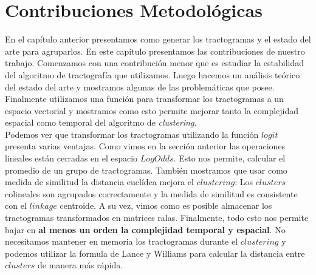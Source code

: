 \chapter{Contribuciones Metodol\'ogicas}
\label{ch:contribuciones}

En el cap\'itulo anterior presentamos como generar los tractogramas y el 
estado del arte para agruparlos. En este cap\'itulo presentamos las
contribuciones de nuestro trabajo. Comenzamos con una contribuci\'on menor
que es estudiar la estabilidad del algoritmo de tractograf\'ia que
utilizamos. Luego hacemos un an\'alisis te\'orico del estado del arte y
mostramos algunas de las problem\'aticas que posee. Finalmente utilizamos
una funci\'on para transformar los tractogramas a un espacio vectorial y
mostramos como esto permite mejorar tanto la complejidad espacial como
temporal del algoritmo de \textit{clustering}. \\











Podemos ver que transformar los tractogramas utilizando la funci\'on $logit$
presenta varias ventajas. Como vimos en la secci\'on anterior las
operaciones lineales est\'an cerradas en el espacio $LogOdds$. Esto nos permite,
calcular el promedio de un grupo de tractogramas. Tambi\'en mostramos que usar 
como medida de similitud la distancia eucl\'idea mejora el $clustering$:
Los $clusters$ colineales son agrupados correctamente y la medida de similitud
es consistente con el $linkage$ centroide. A su vez, vimos como es posible 
almacenar los tractogramas transformados en matrices ralas. Finalmente, 
todo esto nos permite bajar en \textbf{al menos un orden la complejidad temporal
y espacial}. No necesitamos mantener en memoria los tractogramas durante el
$clustering$ y podemos utilizar la formula de Lance y Williams para
calcular la distancia entre $clusters$ de manera m\'as r\'apida. \\
